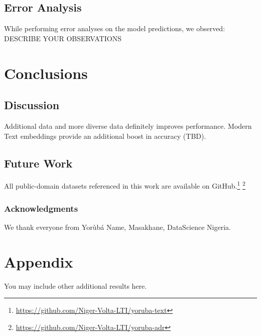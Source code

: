 \documentclass{article} %
\begin{document}
\subsection{Error Analysis}
While performing error analyses on the model predictions, we observed: DESCRIBE YOUR OBSERVATIONS

\section{Conclusions}

\subsection{Discussion} %
Additional data and more diverse data definitely improves performance. Modern Text embeddings provide an additional boost in accuracy (TBD).


\subsection{Future Work}

All public-domain datasets referenced in this work are available on GitHub.\footnote{\url{https://github.com/Niger-Volta-LTI/yoruba-text}} \footnote{\url{https://github.com/Niger-Volta-LTI/yoruba-adr}}

\subsubsection*{Acknowledgments}
We thank everyone from Yor{\`u}b{\'a} Name, Masakhane, DataScience Nigeria. 




\appendix
\section{Appendix}
You may include other additional results here. 
\end{document}
